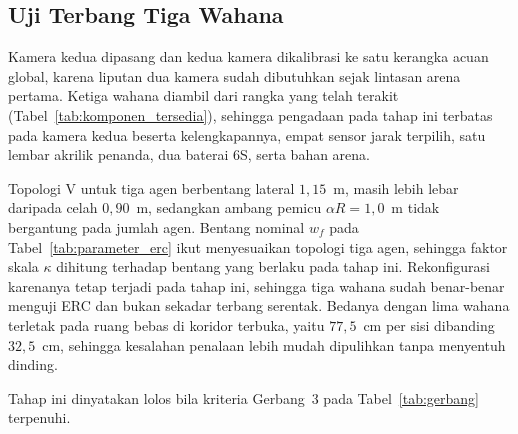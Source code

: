 \documentclass[12pt,a4paper]{report}
\begin{document}
\subsection{Uji Terbang Tiga Wahana}
Kamera kedua dipasang dan kedua kamera dikalibrasi ke satu kerangka acuan global, karena liputan dua kamera sudah dibutuhkan sejak lintasan arena pertama. Ketiga wahana diambil dari rangka yang telah terakit (Tabel~\ref{tab:komponen_tersedia}), sehingga pengadaan pada tahap ini terbatas pada kamera kedua beserta kelengkapannya, empat sensor jarak terpilih, satu lembar akrilik penanda, dua baterai 6S, serta bahan arena.

Topologi V untuk tiga agen berbentang lateral $1{,}15$~m, masih lebih lebar daripada celah $0{,}90$~m, sedangkan ambang pemicu $\alpha R = 1{,}0$~m tidak bergantung pada jumlah agen. Bentang nominal $w_f$ pada Tabel~\ref{tab:parameter_erc} ikut menyesuaikan topologi tiga agen, sehingga faktor skala $\kappa$ dihitung terhadap bentang yang berlaku pada tahap ini. Rekonfigurasi karenanya tetap terjadi pada tahap ini, sehingga tiga wahana sudah benar-benar menguji ERC dan bukan sekadar terbang serentak. Bedanya dengan lima wahana terletak pada ruang bebas di koridor terbuka, yaitu $77{,}5$~cm per sisi dibanding $32{,}5$~cm, sehingga kesalahan penalaan lebih mudah dipulihkan tanpa menyentuh dinding.

Tahap ini dinyatakan lolos bila kriteria Gerbang~3 pada Tabel~\ref{tab:gerbang} terpenuhi.
\end{document}

